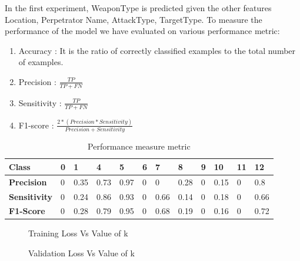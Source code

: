 \documentclass[journal,onecolumn,11pt]{IEEEtran}
\begin{document}
In the first experiment, WeaponType is predicted given the other features Location, Perpetrator Name, AttackType, TargetType. To measure the performance of the model we have evaluated on various performance metric:\newline
\begin{enumerate}
\item Accuracy : It is the ratio of correctly classified examples to the total number of examples.
\item Precision : $\frac{TP}{TP + FN}$
\item Sensitivity : $\frac{TP}{TP +FN}$
\item F1-score : $\frac{2 * (Precision * Sensitivity)} {Precision + Sensitivity}$

\end{enumerate}
\begin{table}[h!]
\centering
\begin{tabular}{|l|l|l|l|l|l|l|l|l|l|l|l|}
\hline
\textbf{Class} & 0 & 1 & 4 & 5 & 6 & 7 & 8 & 9 & 10 & 11 & 12 \\ \hline
\textbf{Precision} & 0 & 0.35 & 0.73 & 0.97 & 0 & 0 & 0.28 & 0 & 0.15 & 0 & 0.8 \\ \hline
\textbf{Sensitivity} & 0 & 0.24 & 0.86 & 0.93 & 0 & 0.66 & 0.14 & 0 & 0.18 & 0 & 0.66 \\ \hline
\textbf{F1-Score} & 0 & 0.28 & 0.79 & 0.95 & 0 & 0.68 & 0.19 & 0 & 0.16 & 0 & 0.72 \\ \hline
\end{tabular}
\caption{Performance measure metric}
\end{table}

\begin{figure}[!htb]\centering
\begin{minipage}{0.4\textwidth}
\centering
\def\svgwidth{\columnwidth}

\caption{Training Loss Vs Value of k}
\end{minipage}
\begin {minipage}{0.4\textwidth}
\centering
\def\svgwidth{\columnwidth}

\caption{Validation Loss Vs Value of k}
\end{minipage}
\end{figure}


\newpage
\end{document}
